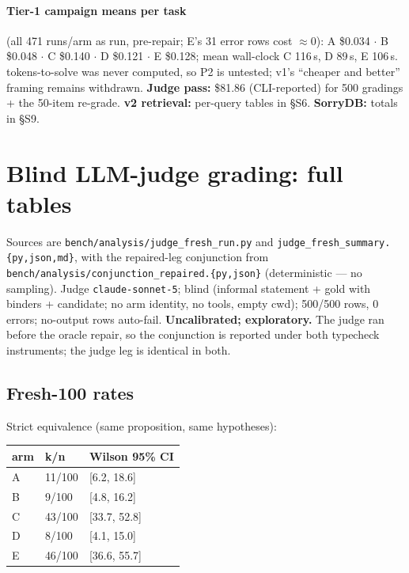 \documentclass[10pt]{article}
\newcommand{\code}[1]{\texttt{#1}}
\begin{document}
\paragraph{Tier-1 campaign means per task} (all 471 runs/arm as run,
pre-repair; E's 31 error rows cost $\approx$0): A \$0.034 $\cdot$ B
\$0.048 $\cdot$ C \$0.140 $\cdot$ D \$0.121 $\cdot$ E \$0.128; mean
wall-clock C 116\,s, D 89\,s, E 106\,s. tokens-to-solve was never
computed, so P2 is untested; v1's ``cheaper and better'' framing
remains withdrawn. \textbf{Judge pass:} \$81.86 (CLI-reported) for 500
gradings + the 50-item re-grade. \textbf{v2 retrieval:} per-query
tables in \S S6. \textbf{SorryDB:} totals in \S S9.

\section{Blind LLM-judge grading: full tables}\label{s11}

Sources are \code{bench/analysis/judge\_fresh\_run.py} and
\code{judge\_fresh\_summary.\{py,json,md\}}, with the repaired-leg
conjunction from \code{bench/analysis/conjunction\_repaired.\{py,json\}}
(deterministic --- no sampling). Judge \code{claude-sonnet-5}; blind
(informal statement + gold with binders + candidate; no arm identity,
no tools, empty cwd); 500/500 rows, 0 errors; no-output rows
auto-fail. \textbf{Uncalibrated; exploratory.} The judge ran before
the oracle repair, so the conjunction is reported under both typecheck
instruments; the judge leg is identical in both.

\subsection{Fresh-100 rates}\label{s11:rates}

Strict equivalence (same proposition, same hypotheses):

\begin{center}\footnotesize
\begin{tabular}{@{}lll@{}}
\toprule
arm & k/n & Wilson 95\% CI \\
\midrule
A & 11/100 & [6.2, 18.6] \\
B & 9/100 & [4.8, 16.2] \\
C & 43/100 & [33.7, 52.8] \\
D & 8/100 & [4.1, 15.0] \\
E & 46/100 & [36.6, 55.7] \\
\bottomrule
\end{tabular}
\end{center}
\end{document}
